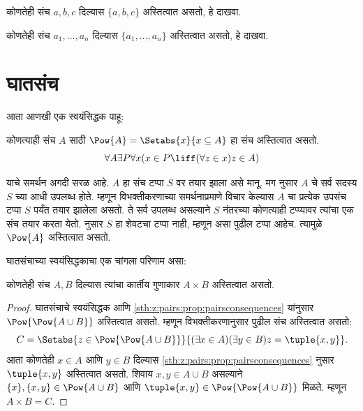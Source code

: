 \begin{prob}
कोणतेही संच $a, b, c$ दिल्यास $\{a, b, c\}$ अस्तित्वात असतो, हे दाखवा.
\end{prob}

\begin{prob}
कोणतेही संच $a_1, \ldots, a_n$ दिल्यास $\{a_1, \ldots,
a_n\}$ अस्तित्वात असतो, हे दाखवा.
\end{prob}












\section{घातसंच}\label{sth:z:power:sec}

आता आणखी एक स्वयंसिद्धक पाहू:

\begin{axiom}[घातसंच]
कोणत्याही संच $A$ साठी $\Pow{A} = \Setabs{x}{x \subseteq A}$ हा संच अस्तित्वात असतो.
\[
	\forall A \exists P \forall x(x \in P \liff (\forall z \in x)z \in A)
\]
\end{axiom}

याचे समर्थन अगदी सरळ आहे. $A$ हा संच टप्पा $S$ वर तयार झाला असे मानू. मग \stagesacc{} नुसार $A$ चे सर्व सदस्य $S$ च्या आधी उपलब्ध होते. म्हणून विभक्तीकरणाच्या समर्थनाप्रमाणे विचार केल्यास $A$ चा प्रत्येक उपसंच टप्पा $S$ पर्यंत तयार झालेला असतो. ते सर्व उपलब्ध असल्याने $S$ नंतरच्या कोणत्याही टप्प्यावर त्यांचा एक संच तयार करता येतो. \stagessucc{} नुसार $S$ हा शेवटचा टप्पा नाही, म्हणून असा पुढील टप्पा आहेच. त्यामुळे $\Pow{A}$ अस्तित्वात असतो.

घातसंचाच्या स्वयंसिद्धकाचा एक चांगला परिणाम असा:

\begin{prop}\label{thm:Products}
कोणतेही संच $A, B$ दिल्यास त्यांचा कार्तीय गुणाकार $A \times B$ अस्तित्वात असतो.
\end{prop}

\begin{proof}
घातसंचाचे स्वयंसिद्धक आणि \ref{sth:z:pairs:prop:pairsconsequences} यांनुसार $\Pow{\Pow{A \cup B}}$ अस्तित्वात असतो. म्हणून विभक्तीकरणानुसार पुढील संच अस्तित्वात असतो:
\[
	C = \Setabs{z \in \Pow{\Pow{A \cup B}}}{(\exists x \in A)(\exists y \in B) z = \tuple{x, y}}.
\]
आता कोणतेही $x \in A$ आणि $y \in B$ दिल्यास \ref{sth:z:pairs:prop:pairsconsequences} नुसार $\tuple{x, y}$ अस्तित्वात असतो. शिवाय $x, y
\in A \cup B$ असल्याने $\{x\}, \{x, y\} \in \Pow{A \cup B}$ आणि $\tuple{x,y} \in \Pow{\Pow{A \cup B}}$ मिळते. म्हणून $A \times B = C$.
\end{proof}


